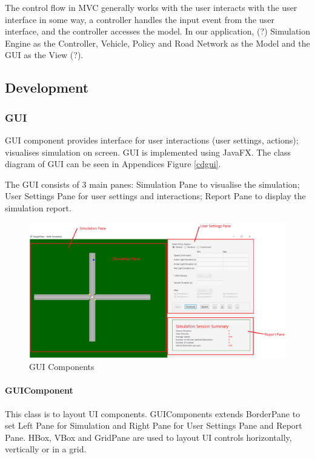 \documentclass[11pt]{article}
\begin{document}
{\begin{itemize}
The control flow in MVC generally works with the user interacts with the user interface in some way, a controller handles the input event from the user interface, and the controller accesses the model. In our application, (?)
Simulation Engine as the Controller, Vehicle, Policy and Road Network as the Model and the GUI as the View (?). 


\subsection{Development}
\subsubsection{GUI}
GUI component provides interface for user interactions (user settings, actions); visualises simulation on screen. GUI is implemented using JavaFX. The class diagram of GUI can be seen in Appendices Figure \ref{cdgui}.
    
The GUI consists of 3 main panes: Simulation Pane to visualise the simulation; User Settings Pane for user settings and interactions; Report Pane to display the simulation report. 

 \begin{figure}[H]
        \includegraphics[width=16cm]{GUIComponent} 
        \caption{GUI Components } 
        \label{gui}
    \end{figure}
    
    
    \paragraph{GUIComponent}
    This class is to layout UI components. GUIComponents extends BorderPane to set Left Pane for Simulation and Right Pane for User Settings Pane and Report Pane. 
    HBox, VBox and GridPane are used to layout UI controls horizontally, vertically or in a grid. 
    

\end{itemize}}
\end{document}
